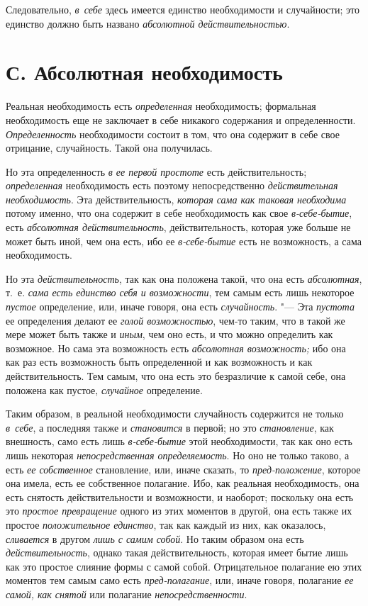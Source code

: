 Следовательно, {\em в~себе} здесь имеется единство
необходимости и случайности; это единство должно быть названо
{\em абсолютной действительностью}.

\section[С. Абсолютная необходимость]{С. Абсолютная необходимость}

Реальная необходимость есть {\em определенная} необходимость; формальная
необходимость еще не заключает в себе никакого содержания и определенности.
{\em Определенность} необходимости состоит в том, что
она содержит в себе свое отрицание, случайность. Такой она получилась.

Но эта определенность {\em в ее первой простоте} есть
действительность; {\em определенная} необходимость есть
поэтому непосредственно {\em действительная
необходимость}. Эта действительность, {\em которая сама
как таковая необходима} потому именно, что она содержит в себе
необходимость как свое {\em в-себе-бытие}, есть
{\em абсолютная действительность}, действительность,
которая уже больше не может быть иной, чем она есть, ибо ее
{\em в-себе-бытие} есть не возможность, а сама необходимость.

Но эта {\em действительность}, так как она положена
такой, что она есть {\em абсолютная}, т.~е.
{\em сама есть единство себя и возможности}, тем самым
есть лишь некоторое {\em пустое} определение, или,
иначе говоря, она есть {\em случайность}. "--- Эта
{\em пустота} ее определения делают ее
{\em голой возможностью}, чем-то таким, что в такой же
мере может быть также и {\em иным}, чем оно есть, и что
можно определить как возможное. Но сама эта возможность есть
{\em абсолютная возможность;} ибо она как раз есть
возможность быть определенной и как возможность и как действительность. Тем
самым, что она есть это безразличие к самой себе, она положена как пустое,
{\em случайное} определение.

Таким образом, в реальной необходимости случайность содержится не только
{\em в~себе}, а последняя также и {\em становится} в первой; но это
{\em становление}, как внешность, само есть лишь
{\em в-себе-бытие} этой необходимости, так как оно есть
лишь некоторая {\em непосредственная определяемость}.
Но оно не только таково, а есть {\em ее собственное}
становление, или, иначе сказать, то
{\em пред-положение}, которое она имела, есть ее
собственное полагание. Ибо, как реальная необходимость, она есть снятость
действительности и возможности, и наоборот; поскольку она есть это
{\em простое превращение} одного из этих моментов в
другой, она есть также их простое {\em положительное
единство}, так как каждый из них, как оказалось,
{\em сливается} в другом {\em лишь
с самим собой}. Но таким образом она есть
{\em действительность}, однако такая действительность,
которая имеет бытие лишь как это простое слияние формы с самой собой.
Отрицательное полагание ею этих моментов тем самым само есть
{\em пред-полагание}, или, иначе говоря, полагание
{\em ее самой, как снятой}
или полагание {\em непосредственности}.

